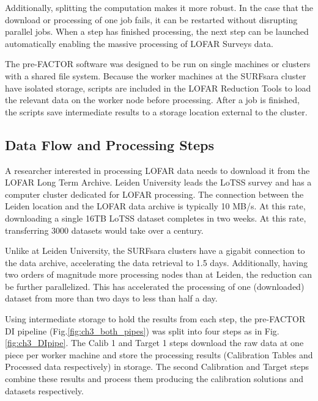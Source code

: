 Additionally, splitting the computation makes it more robust. In the case that the download or processing of one job fails, it can be restarted without disrupting parallel jobs. When a step has finished processing, the next step can be launched automatically enabling the massive processing of LOFAR Surveys data. 

The pre-FACTOR software was designed to be run on single machines or clusters with a shared file system. Because the worker machines at the SURFsara cluster have isolated storage, scripts are included in the LOFAR Reduction Tools to load the relevant data on the worker node before processing. After a job is finished, the scripts save intermediate results to a storage location external to the cluster. 

\subsection{Data Flow and Processing Steps}\label{sec:ch3_dataflow}

A researcher interested in processing LOFAR data needs to download it from the LOFAR Long Term Archive. Leiden University leads the LoTSS survey and has a computer cluster dedicated for LOFAR processing. The connection between the Leiden location and the LOFAR data archive is typically 10 MB/s. At this rate, downloading a single 16TB LoTSS dataset completes in two weeks. At this rate, transferring 3000 datasets would take over a century. 

Unlike at Leiden University, the SURFsara clusters have a gigabit connection to the data archive, accelerating the data retrieval to 1.5 days. Additionally, having two orders of magnitude more processing nodes than at Leiden, the reduction can be further parallelized. This has accelerated the processing of one (downloaded) dataset from more than two days to less than half a day.

Using intermediate storage to hold the results from each step, the pre-FACTOR DI pipeline (Fig.\ref{fig:ch3_both_pipes}) was split into four steps as in Fig. \ref{fig:ch3_DIpipe}. The Calib 1 and Target 1 steps download the raw data at one piece per worker machine and store the processing results (Calibration Tables and Processed data respectively) in storage. The second Calibration and Target steps combine these results and process them producing the calibration solutions and datasets respectively. 


